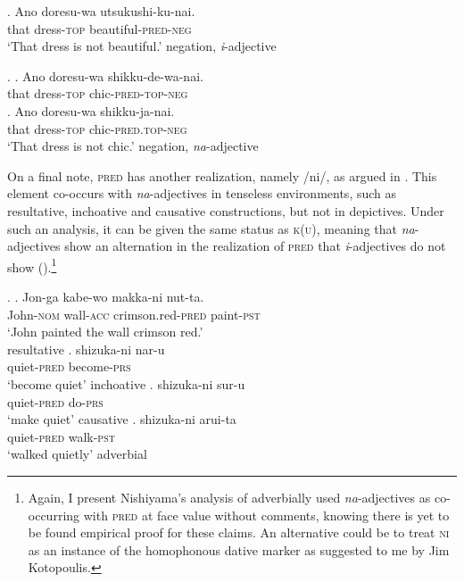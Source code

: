 \documentclass [output=book,colorlinks,citecolor=brown]{langscibook}
\begin{document}

\exg. Ano doresu-wa utsukushi-ku-nai.\\
that dress-\textsc{top} beautiful-\textsc{pred-neg}\\
`That dress is not beautiful.' \null \hfill negation, \textit{i}-adjective \label{negation i}

\ex. \ag.  Ano doresu-wa shikku-de-wa-nai.\\
that dress-\textsc{top} chic-\textsc{pred-top-neg} \label{negation na long}\\
\bg. Ano doresu-wa shikku-ja-nai.\\
that dress-\textsc{top} chic-\textsc{pred.top-neg}\\
`That dress is not chic.' \null \hfill negation, \textit{na}-adjective \label{negation na short}

On a final note, \textsc{pred} has another realization, namely /ni/, as argued in \citet{nishiyama:1999:adj}. This element co-occurs with \textit{na}-adjectives in tenseless environments, such as resultative, inchoative and causative constructions, but not in depictives. Under such an analysis, it can be given the same status as \textsc{k(u)}, meaning that \textit{na}-adjectives show an alternation in the realization of \textsc{pred} that \textit{i}-adjectives do not show (\citealt[205–208]{nishiyama:1999:adj}).\footnote{Again, I present Nishiyama’s analysis of adverbially used \textit{na}-adjectives as co-occurring with \textsc{pred} at face value without comments, knowing there is yet to be found empirical proof for these claims. An alternative could be to treat \textsc{ni} as an instance of the homophonous dative marker as suggested to me by Jim Kotopoulis.}

\ex. \ag. Jon-ga kabe-wo makka-ni nut-ta.\\
John-\textsc{nom} wall-\textsc{acc} crimson.red-\textsc{pred} paint-\textsc{pst}\\
`John painted the wall crimson red.’ \\ \null\hfill resultative \citep[207]{nishiyama:1999:adj}
\bg. shizuka-ni nar-u\\
quiet-\textsc{pred} become-\textsc{prs}\\
`become quiet' \null \hfill inchoative
\cg. shizuka-ni sur-u\\
quiet-\textsc{pred} do-\textsc{prs}\\
`make quiet' \null \hfill causative
\dg. shizuka-ni arui-ta\\
quiet-\textsc{pred} walk-\textsc{pst}\\
`walked quietly' \null\hfill adverbial \citep[150]{nishiyama:2005:baker}
\end{document}
